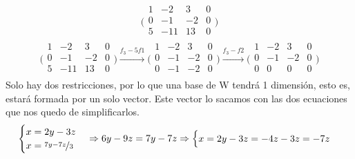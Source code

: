 \documentclass[11pt]{article}
\begin{document}
\begin{question}
\begin{subquestion}
{\begin{equation*}
            \Bigg(
                \begin{array}{ccc|c}
                    1 & -2 & 3 & 0 \\
                    0 & -1 & -2 & 0 \\
                    5 & -11 & 13 & 0 \\
                \end{array}
            \Bigg)
        \end{equation*}
        \begin{equation*}
            \Bigg(
                \begin{array}{ccc|c}
                    1 & -2 & 3 & 0 \\
                    0 & -1 & -2 & 0 \\
                    5 & -11 & 13 & 0 \\
                \end{array}
            \Bigg)
            \xrightarrow{f_{3}-5f{1}}
            \Bigg(
                \begin{array}{ccc|c}
                    1 & -2 & 3 & 0 \\
                    0 & -1 & -2 & 0 \\
                    0 & -1 & -2 & 0 \\
                \end{array}
            \Bigg)
            \xrightarrow{f_{3}-f{2}}
            \Bigg(
                \begin{array}{ccc|c}
                    1 & -2 & 3 & 0 \\
                    0 & -1 & -2 & 0 \\
                    0 & 0 & 0 & 0 \\
                \end{array}
            \Bigg)
        \end{equation*}
        Solo hay dos restricciones, por lo que una base de W tendrá 1 dimensión, esto es, estará formada por un solo vector. Este vector lo sacamos con las dos ecuaciones que nos quedo de simplificarlos.
        \begin{equation*}
            \begin{cases}
                x=2y-3z\\
                x=\nicefrac{7y-7z}{3}
            \end{cases}
            \Rightarrow
            6y-9z=7y-7z
            \Rightarrow
            \begin{cases}
                x=2y-3z=-4z-3z=-7z\\

\end{cases}
\end{equation*}}
\end{subquestion}
\end{question}
\end{document}

